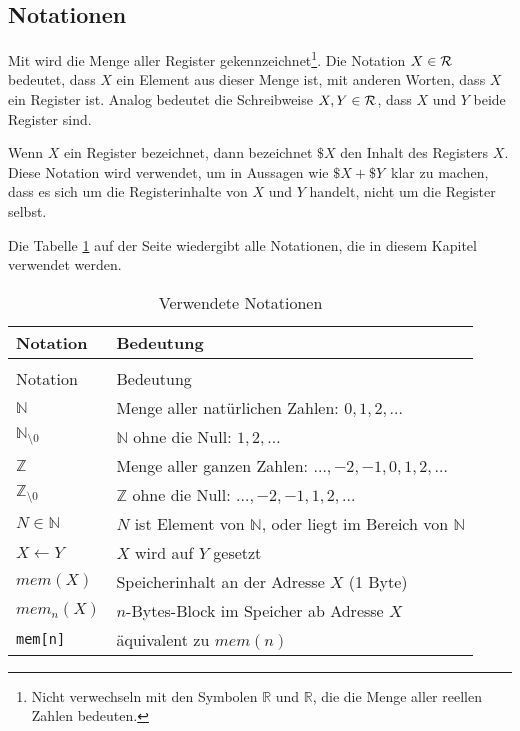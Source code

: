 \subsection{Notationen}


Mit \Reg\index{\Reg} wird die Menge aller Register
gekennzeichnet\footnote{Nicht verwechseln mit den Symbolen $\mathds{R}$ und
$\mathbb{R}$, die die Menge aller reellen Zahlen bedeuten.}.
Die Notation $X \in \mathcal{R}$ bedeutet, dass $X$ ein Element aus dieser Menge ist,
mit anderen Worten, dass $X$ ein Register ist. Analog bedeutet die
Schreibweise $X,Y \in \mathcal{R}$, dass $X$ und $Y$ beide Register sind.


Wenn $X$ ein Register bezeichnet, dann bezeichnet $\$X$ den Inhalt des
Registers $X$. Diese Notation wird verwendet, um in Aussagen wie 
\glqq $\$X + \$Y$\grqq\ klar zu machen, dass es sich um die Registerinhalte von
$X$ und $Y$ handelt, nicht um die Register selbst.

Die Tabelle \ref{tab:Notationen} auf der Seite \pageref{tab:Notationen}
wiedergibt alle Notationen, die in diesem Kapitel verwendet werden.

\begin{longtable}{ll}
 \caption{Verwendete Notationen}
 \label{tab:Notationen}
 \\\toprule
 Notation & Bedeutung \\\midrule
 \endfirsthead
 \\\toprule
 Notation & Bedeutung \\\midrule
 \endhead
 $\mathds{N}$ & Menge aller natürlichen Zahlen: $0,1,2,\ldots$         \\
 $\mathds{N}_{\setminus 0}$ 
              & $\mathds{N}$ ohne die Null: $1,2,\ldots$               \\
 $\mathds{Z}$ & Menge aller ganzen Zahlen: $\ldots,-2,-1,0,1,2,\ldots$ \\
 $\mathds{Z}_{\setminus 0}$ 
              & $\mathds{Z}$ ohne die Null: $\ldots,-2,-1,1,2,\ldots$  \\
 $N \in \mathds{N}$
              & $N$ ist Element von $\mathds{N}$, oder liegt im Bereich von
              $\mathds{N}$                                             \\
 $X \gets Y$  & $X$ wird auf $Y$ gesetzt                               \\
 $mem(X)$     & Speicherinhalt an der Adresse $X$ (1 Byte)             \\
 $mem_{n}(X)$ & $n$-Bytes-Block im Speicher ab Adresse $X$             \\
 \texttt{mem[n]}
              & äquivalent zu $mem(n)$                                 \\
 \bottomrule
 
\end{longtable}

